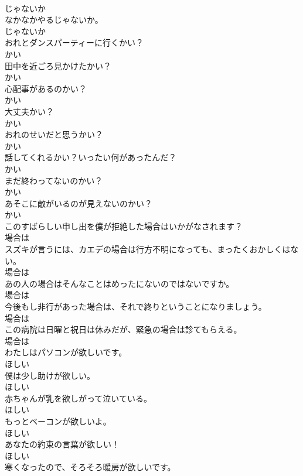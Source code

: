 \documentclass[8pt]{extreport}
\begin{document}
\begin{CJK}{UTF8}{min}
\\	じゃないか	
\\	なかなかやるじゃないか。	
\\	じゃないか	
\\	おれとダンスパーティーに行くかい？	
\\	かい	
\\	田中を近ごろ見かけたかい？	
\\	かい	
\\	心配事があるのかい？	
\\	かい	
\\	大丈夫かい？	
\\	かい	
\\	おれのせいだと思うかい？	
\\	かい	
\\	話してくれるかい？いったい何があったんだ？	
\\	かい	
\\	まだ終わってないのかい？	
\\	かい	
\\	あそこに敵がいるのが見えないのかい？	
\\	かい	
\\	このすばらしい申し出を僕が拒絶した場合はいかがなされます？	
\\	場合は	
\\	スズキが言うには、カエデの場合は行方不明になっても、まったくおかしくはない。	
\\	場合は	
\\	あの人の場合はそんなことはめったにないのではないですか。	
\\	場合は	
\\	今後もし非行があった場合は、それで終りということになりましょう。	
\\	場合は	
\\	この病院は日曜と祝日は休みだが、緊急の場合は診てもらえる。	
\\	場合は	
\\	わたしはパソコンが欲しいです。	
\\	ほしい	
\\	僕は少し助けが欲しい。	
\\	ほしい	
\\	赤ちゃんが乳を欲しがって泣いている。	
\\	ほしい	
\\	もっとベーコンが欲しいよ。	
\\	ほしい	
\\	あなたの約束の言葉が欲しい！	
\\	ほしい	
\\	寒くなったので、そろそろ暖房が欲しいです。	

\end{CJK}
\end{document}
